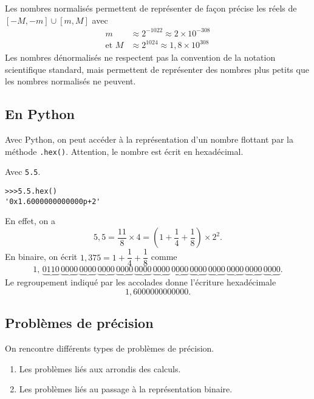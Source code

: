 Les nombres normalisés permettent de représenter de façon précise les
réels de
$[-M,-m]\cup [m, M]$ 
avec
\begin{align*}
  m &\approx2^{-1022}\approx 2\times 10^{-308}\\
\text{et }  M &\approx 2^{1024}\approx 1,8 \times 10^{308}
\end{align*}
Les nombres dénormalisés ne respectent pas la convention de la notation scientifique standard, mais permettent de représenter des nombres plus petits que les nombres normalisés ne peuvent. 



\subsection{En Python}

Avec Python, on peut accéder à la représentation d'un nombre flottant par la méthode \texttt{.hex()}. Attention, le nombre est écrit en hexadécimal. 

\begin{exemple}
  Avec \texttt{5.5}. 
\begin{lstlisting}
>>>5.5.hex()
'0x1.6000000000000p+2'
\end{lstlisting}
En effet, on a 
\begin{equation*}
  5,5 = \dfrac{11}{8} \times 4 = \left(1 + \dfrac{1}{4} + \dfrac{1}{8} \right) \times 2^2.
\end{equation*}
En binaire, on écrit $1,375 = 1+\dfrac{1}{4} + \dfrac{1}{8}$ comme 
\begin{equation*}
  1,\,\underbrace{0110}\,\underbrace{0000}\,\underbrace{0000}\,\underbrace{0000}\,\underbrace{0000}\,\underbrace{0000}\,\underbrace{0000}\,\underbrace{0000}\,\underbrace{0000}\,\underbrace{0000}\,\underbrace{0000}\,\underbrace{0000}\,\underbrace{0000}.
\end{equation*}
Le regroupement indiqué par les accolades donne l'écriture hexadécimale 
\begin{equation*}
  1,6000000000000.
\end{equation*}
\end{exemple}


\subsection{Problèmes de précision}

On rencontre différents types de problèmes de précision.
\begin{enumerate}
\item Les problèmes liés aux arrondis des calculs.
\item Les problèmes liés au passage à la représentation binaire.
\end{enumerate}

